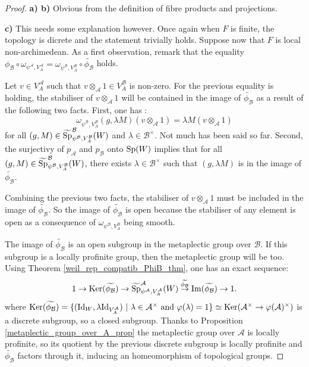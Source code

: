 \documentclass[11pt]{article}
\theoremstyle{plain}
\theoremstyle{definition}
\theoremstyle{plain}
\theoremstyle{definition}
\theoremstyle{plain}
\begin{document}
\begin{proof} \textbf{a) b)} Obvious from the definition of fibre products and projections.

\noindent \textbf{c)} This needs some explanation however. Once again when $F$ is finite, the topology is dicrete and the statement trivially holds. Suppose now that $F$ is local non-archimedean. As a first observation, remark that the equality $\phi_\mathcal{B} \circ \omega_{\psi^\mathcal{A},V_A^\mathcal{A}} = \omega_{\psi^\mathcal{B},V_A^\mathcal{B}} \circ \widetilde{\phi_\mathcal{B}}$ holds.

Let $v \in V_A^\mathcal{A}$ such that $v \otimes_\mathcal{A} 1 \in V_A^\mathcal{B}$ is non-zero. For the previous equality is holding, the stabiliser of $v \otimes_\mathcal{A} 1$ will be contained in the image of $\widetilde{\phi_\mathcal{B}}$ as a result of the following two facts. First, one has :
$$\omega_{\psi^\mathcal{B},V_A^\mathcal{B}}(g,\lambda M) (v \otimes_\mathcal{A} 1)= \lambda M (v \otimes_\mathcal{A} 1)$$
for all $(g,M) \in \widetilde{\textup{Sp}}_{\psi^\mathcal{B},V_A^\mathcal{B}}^\mathcal{B}(W)$ and $\lambda \in \mathcal{B}^\times$. Not much has been said so far. Second, the surjectivy of $p_\mathcal{A}$ and $p_\mathcal{B}$ onto $\textup{Sp}(W)$ implies that for all $(g,M) \in \widetilde{\textup{Sp}}_{\psi^\mathcal{B},V_A^\mathcal{B}}^\mathcal{B}(W)$, there exists $\lambda \in \mathcal{B}^\times$ such that $(g,\lambda M)$ is in the image of $\widetilde{\phi_\mathcal{B}}$.

Combining the previous two facts, the stabiliser of $v\otimes_\mathcal{A} 1$ must be included in the image of $\widetilde{\phi_\mathcal{B}}$. So the image of $\widetilde{\phi_\mathcal{B}}$ is open because the stabiliser of any element is open as a consequence of $\omega_{\psi^\mathcal{B},V_A^\mathcal{B}}$ being smooth.

The image of $\widetilde{\phi_\mathcal{B}}$ is an open subgroup in the metaplectic group over $\mathcal{B}$. If this subgroup is a locally profinite group, then the metaplectic group will be too. Using Theorem \ref{weil_rep_compatib_PhiB_thm}, one has an exact sequence:
$$1 \to \textup{Ker}(\widetilde{\phi_\mathcal{B}}) \to \widetilde{\textup{Sp}}_{\psi^\mathcal{A},V_A^\mathcal{A}}^\mathcal{A}(W) \overset{\widetilde{\phi_\mathcal{B}}}{\to} \textup{Im}(\widetilde{\phi_\mathcal{B}}) \to 1.$$
where $\textup{Ker}(\widetilde{\phi_\mathcal{B}}) = \{ (\textup{Id}_W,\lambda \textup{Id}_{V_A^\mathcal{A}}) \ | \ \lambda \in \mathcal{A}^\times \textup{ and } \varphi(\lambda) = 1 \} \simeq \textup{Ker}(\mathcal{A}^\times \to \varphi(\mathcal{A})^\times)$ is a discrete subgroup, so a closed subgroup. Thanks to Proposition \ref{metaplectic_group_over_A_prop} the metaplectic group over $\mathcal{A}$ is locally profinite, so its quotient by the previous discrete subgroup is locally profinite and $\widetilde{\phi_\mathcal{B}}$ factors through it, inducing an homeomorphism of topological groups.


\end{proof}
\end{document}
